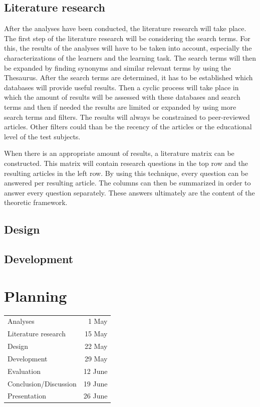 \documentclass[12pt]{report} %
\begin{document}
\section{Literature research}

After the analyses have been conducted, the literature research will take place. The first step of the literature research will be considering the search terms. For this, the results of the analyses will have to be taken into account, especially the characterizations of the learners and the learning task. The search terms will then be expanded by finding synonyms and similar relevant terms by using the Thesaurus. After the search terms are determined, it has to be established which databases will provide useful results. Then a cyclic process will take place in which the amount of results will be assessed with these databases and search terms and then if needed the results are limited or expanded by using more search terms and filters. The results will always be constrained to peer-reviewed articles. Other filters could than be the recency of the articles or the educational level of the test subjects.

When there is an appropriate amount of results, a literature matrix can be constructed. This matrix will contain research questions in the top row and the resulting articles in the left row. By using this technique, every question can be answered per resulting article. The columns can then be summarized in order to answer every question separately. These answers ultimately are the content of the theoretic framework.

\section{Design}

\section{Development}

\chapter{Planning}

\begin{center}
\begin{tabular}{ l r }
Analyses & 1 May \\
Literature research & 15 May \\
Design & 22 May \\
Development & 29 May \\
Evaluation & 12 June \\
Conclusion/Discussion & 19 June \\
Presentation & 26 June \\
\end{tabular}
\end{center}



\end{document}
